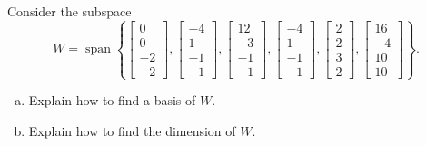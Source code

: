 
\begin{exerciseStatement}


Consider the subspace \[W=\operatorname{span}  \left\{ \left[\begin{array}{c}
0 \\
0 \\
-2 \\
-2
\end{array}\right] , \left[\begin{array}{c}
-4 \\
1 \\
-1 \\
-1
\end{array}\right] , \left[\begin{array}{c}
12 \\
-3 \\
-1 \\
-1
\end{array}\right] , \left[\begin{array}{c}
-4 \\
1 \\
-1 \\
-1
\end{array}\right] , \left[\begin{array}{c}
2 \\
2 \\
3 \\
2
\end{array}\right] , \left[\begin{array}{c}
16 \\
-4 \\
10 \\
10
\end{array}\right] \right\} .\]


\begin{enumerate}[(a)]
\item  Explain how to find a basis of \(W\).
\item  Explain how to find the dimension of \(W\).
\end{enumerate}
    
\end{exerciseStatement}
    
